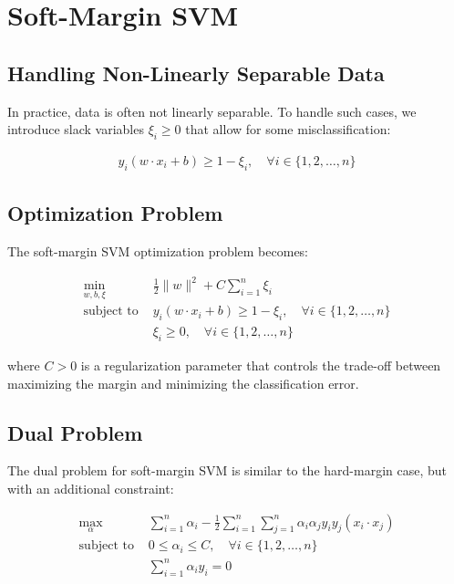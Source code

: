 \documentclass{article}
\begin{document}
\section{Soft-Margin SVM}

\subsection{Handling Non-Linearly Separable Data}

In practice, data is often not linearly separable. To handle such cases, we introduce slack variables $\xi_i \geq 0$ that allow for some misclassification:

\begin{align}
y_i(w \cdot x_i + b) \geq 1 - \xi_i, \quad \forall i \in \{1, 2, \ldots, n\}
\end{align}

\subsection{Optimization Problem}

The soft-margin SVM optimization problem becomes:

\begin{align}
\min_{w, b, \xi} & \frac{1}{2}\|w\|^2 + C \sum_{i=1}^{n} \xi_i \\
\text{subject to } & y_i(w \cdot x_i + b) \geq 1 - \xi_i, \quad \forall i \in \{1, 2, \ldots, n\} \\
& \xi_i \geq 0, \quad \forall i \in \{1, 2, \ldots, n\}
\end{align}

where $C > 0$ is a regularization parameter that controls the trade-off between maximizing the margin and minimizing the classification error.

\subsection{Dual Problem}

The dual problem for soft-margin SVM is similar to the hard-margin case, but with an additional constraint:

\begin{align}
\max_{\alpha} & \sum_{i=1}^{n} \alpha_i - \frac{1}{2} \sum_{i=1}^{n} \sum_{j=1}^{n} \alpha_i \alpha_j y_i y_j (x_i \cdot x_j) \\
\text{subject to } & 0 \leq \alpha_i \leq C, \quad \forall i \in \{1, 2, \ldots, n\} \\
& \sum_{i=1}^{n} \alpha_i y_i = 0
\end{align}
\end{document}
